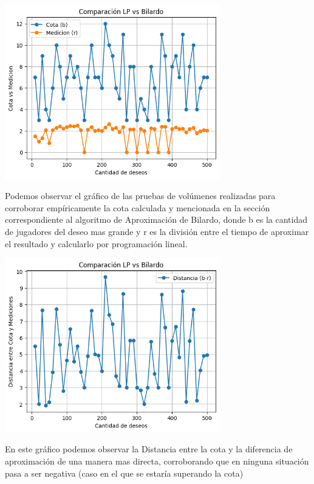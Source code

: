 \documentclass{estilo}
\begin{document}
\newpage
\begin{center}
\includegraphics[width=0.7\textwidth]{img/LPvsBilardo_cota1.png}

Podemos observar el gráfico de las pruebas de volúmenes realizadas para corroborar empíricamente la cota calculada y mencionada en la sección correspondiente al algoritmo de Aproximación de Bilardo, donde b es la cantidad de jugadores del deseo mas grande y r es la división entre el tiempo de aproximar el resultado y calcularlo por programación lineal.
\end{center}

\begin{center}
\includegraphics[width=0.7\textwidth]{img/LPvsBilardo_cota2.png}

En este gráfico podemos observar la Distancia entre la cota y la diferencia de aproximación de una manera mas directa, corroborando que en ninguna situación pasa a ser negativa (caso en el que se estaría superando la cota)
\end{center}
\end{document}
